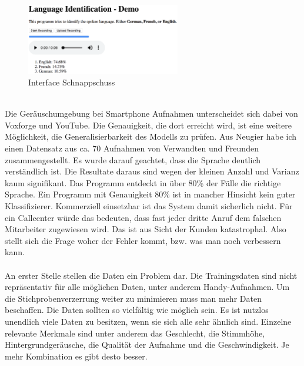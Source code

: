 \begin{figure}[hbt]
	\centering
		\includegraphics[width=0.6\textwidth]{assets/interface.png}
	\caption{Interface Schnappschuss}
	\label{img:interface}
\end{figure}
\\Die Geräuschumgebung bei Smartphone Aufnahmen unterscheidet sich dabei von Voxforge und YouTube. Die Genauigkeit, die dort erreicht wird, ist eine weitere Möglichkeit, die Generalisierbarkeit des Modells zu prüfen. Aus Neugier habe ich einen Datensatz aus ca. 70 Aufnahmen von Verwandten und Freunden zusammengestellt. Es wurde darauf geachtet, dass die Sprache deutlich verständlich ist. Die Resultate daraus sind wegen der kleinen Anzahl und Varianz kaum signifikant. Das Programm entdeckt in über 80\% der Fälle die richtige Sprache. 
Ein Programm mit Genauigkeit 80\% ist in mancher Hinsicht kein guter Klassifizierer. Kommerziell einsetzbar ist das System damit sicherlich nicht. Für ein Callcenter würde das bedeuten, dass fast jeder dritte Anruf dem falschen Mitarbeiter zugewiesen wird. Das ist aus Sicht der Kunden katastrophal. Also stellt sich die Frage woher der Fehler kommt, bzw. was man noch verbessern kann.
\\ \\
An erster Stelle stellen die Daten ein Problem dar. Die Trainingsdaten sind nicht repräsentativ für alle möglichen Daten, unter anderem Handy-Aufnahmen. Um die Stichprobenverzerrung weiter zu minimieren muss man mehr Daten beschaffen. Die Daten sollten so vielfältig wie möglich sein. Es ist nutzlos unendlich viele Daten zu besitzen, wenn sie sich alle sehr ähnlich sind. Einzelne relevante Merkmale sind unter anderem das Geschlecht, die Stimmhöhe, Hintergrundgeräusche, die Qualität der Aufnahme und die Geschwindigkeit. Je mehr Kombination es gibt desto besser. 
\\

